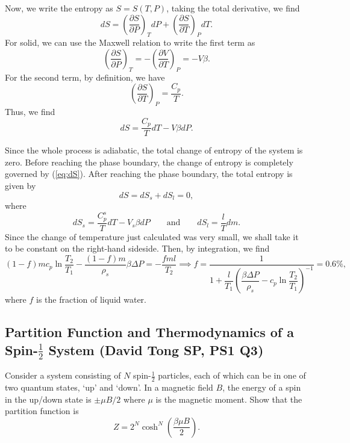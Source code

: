 Now, we write the entropy as $S=S(T,P)$, taking the total derivative, we find
\begin{equation}
    dS = \left(\frac{\partial S}{\partial P}\right)_TdP + \left(\frac{\partial S}{\partial T}\right)_PdT.
\end{equation}
For solid, we can use the Maxwell relation to write the first term as
\begin{equation}
    \left(\frac{\partial S}{\partial P}\right)_T = -\left(\frac{\partial V}{\partial T}\right)_P = -V\beta.
\end{equation}
For the second term, by definition, we have
\begin{equation}
    \left(\frac{\partial S}{\partial T}\right)_P = \frac{C_p}{T}.
\end{equation}
Thus, we find
\begin{equation}
    dS = \frac{C_p}{T}dT - V\beta dP.
    \label{eq:dS}
\end{equation}

Since the whole process is adiabatic, the total change of entropy of the system is zero. Before reaching the phase boundary, the change of entropy is completely governed by (\ref{eq:dS}). After reaching the phase boundary, the total entropy is given by
\begin{equation}
    dS = dS_s + dS_l=0,
\end{equation}
where 
\begin{equation}
    dS_s = \frac{C_p^s}{T}dT - V_s\beta dP \qquad \text{and} \qquad dS_l=\frac{l}{T}dm.
\end{equation}
Since the change of temperature just calculated was very small, we shall take it to be constant on the right-hand sideside. Then, by integration, we find
\begin{equation}
    (1-f)mc_p\ln\frac{T_2}{T_1}- \frac{(1-f)m}{\rho_s}\beta \Delta P = -\frac{fml}{T_2} \implies f= \frac{1}{1+\dfrac{l}{T_1}\left(\dfrac{\beta\Delta P}{\rho_s}-c_p\ln\dfrac{T_2}{T_1}\right)^{-1}} = 0.6\%,
\end{equation}
where $f$ is the fraction of liquid water.

\subsection{Partition Function and Thermodynamics of a Spin-$\frac{1}{2}$ System (David Tong SP, PS1 Q3)}
\label{sec:spin-half}

Consider a system consisting of $N$ spin-$\frac{1}{2}$ particles,
each of which can be in one of two quantum states, `up' and `down'. In a
magnetic field $B$, the energy of a spin in the up/down state is $\pm\mu B/2$
where $\mu$ is the magnetic moment. Show that the partition function is
\begin{equation}
  Z = 2^N \cosh^N\!\left(\frac{\beta\mu B}{2}\right).
\end{equation}

